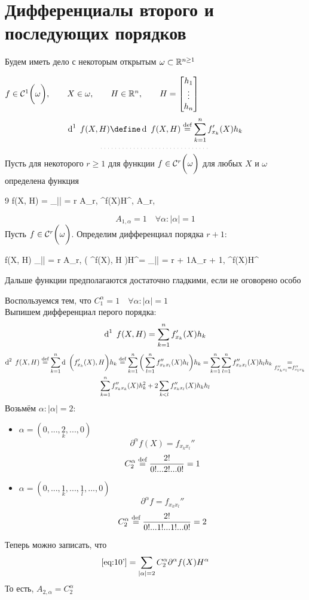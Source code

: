 \section{Дифференциалы второго и последующих порядков}

Будем иметь дело с некоторым открытым $ \omega \sub \R^{n \ge 1} $

\begin{definition}
	$ f \in \Cont[1]\omega, \qquad X \in \omega, \qquad H \in \R^n, \qquad H = \column{h_1}{h_n} $
	$$ \di[1] f(X, H) \define \di f(X, H) \bydef \sum_{k = 1}^n f_{x_k}'(X)h_k $$
	$$ \widedots $$
	Пусть для некоторого $ r \ge 1 $ для функции $ f \in \Cont[r]\omega $ для любых $ X $ и $ \omega $ определена функция
	\begin{equ}9
		\di[r]f(X, H) = \sum_{|\alpha| = r} A_{r,\alpha} \partial^\alpha f(X)H^\alpha, \qquad A_{r,\alpha} 
	\end{equ}
	$$ A_{1,\alpha} = 1 \quad \forall \alpha : |\alpha| = 1 $$
	Пусть $ f \in \Cont[r]\omega $. Определим дифференциал порядка $ r + 1 $:
	\begin{equ}{10}
		\di[r + 1]f(X, H)  \sum_{|\alpha| = r} A_{r,\alpha} \di \bigg( \partial^\alpha f(X), H \bigg)H^\alpha = \sum_{|\alpha| = r + 1}A_{r + 1,\alpha} \partial^\alpha f(X)H^\alpha
	\end{equ}
\end{definition}

Дальше функции предполагаются достаточно гладкими, если не оговорено особо

\begin{eg}
	Воспользуемся тем, что $ C_1^\alpha = 1 \quad \forall \alpha : |\alpha| = 1 $ \\
	Выпишем дифференциал перого порядка:
	$$ \di[1] f(X, H) = \sum_{k = 1}^n f_{x_k}'(X)h_k $$
	\begin{multline}\lbl{10'}
		\di[2] f(X, H) \bydef \sum_{k = 1}^n \di \bigg( f_{x_k}'(X), H \bigg)h_k \bydef \sum_{k = 1}^n \bigg( \sum_{l = 1}^n f_{x_kx_l}''(X)h_l \bigg)h_k = \sum_{k = 1}^n \sum_{l = 1}^n f_{x_kx_l}''(X)h_lh_k \underset{f_{x_kx_l}'' = f_{x_lx_k}''}= \\
		\sum_{k = 1}^n f_{x_kx_k}''(X)h_k^2 + 2\sum_{k < l} f_{x_kx_l}''(X)h_kh_l
	\end{multline}
	Возьмём $ \alpha : |\alpha| = 2 $:
	\begin{itemize}
		\item $ \alpha = (0, ..., \underset{k}2, ..., 0) $
		$$ \partial^\alpha f(X) = f_{x_kx_l}'' $$
		$$ C_2^\alpha \bydef \frac{2!}{0!...2!...0!} = 1 $$
		\item $ \alpha = (0, ..., \underset{k}1, ..., \underset{l}1, ..., 0) $
		$$ \partial^\alpha f = f_{x_kx_l}'' $$
		$$ C_2^\alpha \bydef \frac{2!}{0!...1!...1!...0!} = 2 $$
	\end{itemize}
	Теперь можно записать, что
	$$ \eref{10'} = \sum_{|\alpha| = 2} C_2^\alpha \partial^\alpha f(X) H^\alpha $$
	То есть, $ A_{2,\alpha} = C_2^\alpha $
\end{eg}

